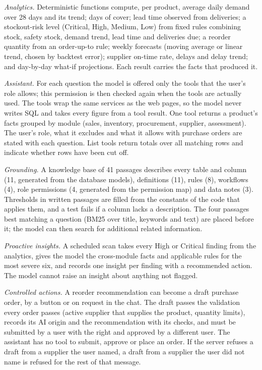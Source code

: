 \documentclass[conference]{IEEEtran}
\begin{document}
\textit{Analytics.} Deterministic functions compute, per product, average daily demand over 28 days and its
trend; days of cover; lead time observed from deliveries; a stockout-risk level (Critical, High, Medium,
Low) from fixed rules combining stock, safety stock, demand trend, lead time and deliveries due; a reorder
quantity from an order-up-to rule; weekly forecasts (moving average or linear trend, chosen by backtest
error); supplier on-time rate, delays and delay trend; and day-by-day what-if projections. Each result
carries the facts that produced it.

\textit{Assistant.} For each question the model is offered only the tools that the user's role allows; this
permission is then checked again when the tools are actually used. The tools wrap the same services as the web pages, so the
model never writes SQL and takes every figure from a tool result. One tool returns a product's facts grouped
by module (sales, inventory, procurement, supplier, assessment). The user's role, what it excludes and what
it allows with purchase orders are stated with each question. List tools return totals over all matching
rows and indicate whether rows have been cut off.

\textit{Grounding.} A knowledge base of 41 passages describes every table and column (11, generated from
the database models), definitions (11), rules (8), workflows (4), role permissions (4, generated from the
permission map) and data notes (3). Thresholds in written passages are filled from the constants of the code
that applies them, and a test fails if a column lacks a description. The four passages best matching a
question (BM25 over title, keywords and text) are placed before it; the model can then search for
additional related information.

\textit{Proactive insights.} A scheduled scan takes every High or Critical finding from the analytics,
gives the model the cross-module facts and applicable rules for the most severe six, and records one insight
per finding with a recommended action. The model cannot raise an insight about anything not flagged.

\textit{Controlled actions.} A reorder recommendation can become a draft purchase order, by a button or on
request in the chat. The draft passes the validation every order passes (active supplier that supplies the
product, quantity limits), records its AI origin and the recommendation with its checks, and must be
submitted by a user with the right and approved by a different user. The assistant has no tool to submit,
approve or place an order. If the server refuses a draft from a supplier the user named, a draft from a
supplier the user did not name is refused for the rest of that message.
\end{document}
